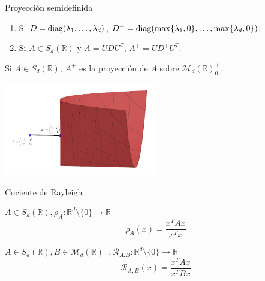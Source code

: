 \documentclass[10pt, compress]{beamer}
\newcommand\R{\mathbb{R}}
\begin{document}
\begin{frame}{Proyección semidefinida}
  \begin{definition}
    \begin{enumerate}
      \item Si $D = \operatorname{diag}(\lambda_1,\dots,\lambda_d)$, $D^+ = \operatorname{diag}(\max\{\lambda_1,0\},\dots,\max\{\lambda_d,0\})$.
      \item Si $A \in S_d(\R)$ y $A = UDU^T$, $A^+ = UD^+U^T$.
    \end{enumerate}
  \end{definition}

  \begin{theorem}
    Si $A \in S_d(\R)$, $A^+$ es la proyección de $A$ sobre $\mathcal{M}_d(\R)^+_0$.
  \end{theorem}

  \centering\includegraphics[width=0.5\textwidth]{images/sdp.png}

\end{frame}

\begin{frame}{Cociente de Rayleigh}
  \begin{definition}
    $A \in S_d(\R), \rho_A \colon \R^d \setminus \{0\} \to \R $
    \[ \rho_A(x) = \frac{x^TAx}{x^Tx}\]
  \end{definition}

  \begin{definition}
    $ A \in S_d(\R), B \in \mathcal{M}_d(\R)^+, \mathcal{R}_{A.B} \colon \R^d \setminus \{0\} \to \R $
    \[ \mathcal{R}_{A,B}(x) = \frac{x^TAx}{x^TBx}\]
  \end{definition}
\end{frame}
\end{document}
